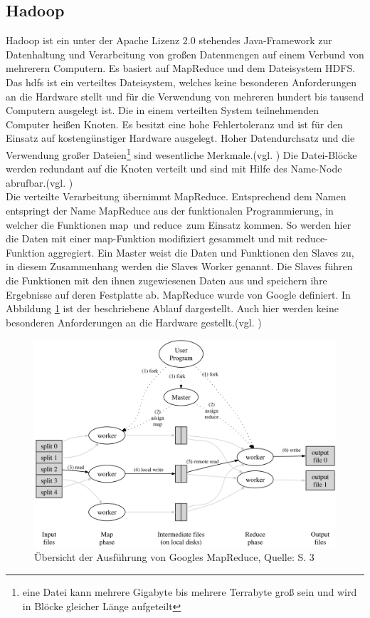 \subsection{Hadoop}
\label{hadoop}

Hadoop ist ein unter der Apache Lizenz 2.0 stehendes Java-Framework zur Datenhaltung und Verarbeitung von großen Datenmengen auf einem Verbund von mehrerern Computern.
Es basiert auf MapReduce und dem Dateisystem HDFS.\\
Das \Gls{hdfs} ist ein verteiltes Dateisystem, welches keine besonderen Anforderungen an die Hardware stellt und für die Verwendung von mehreren hundert bis tausend Computern ausgelegt ist.
Die in einem verteilten System teilnehmenden Computer heißen Knoten.
Es besitzt eine hohe Fehlertoleranz und ist für den Einsatz auf kostengünstiger Hardware ausgelegt.
Hoher Datendurchsatz und die Verwendung großer Dateien\footnote{eine Datei kann mehrere Gigabyte bis mehrere Terrabyte groß sein und wird in Blöcke gleicher Länge aufgeteilt} sind wesentliche Merkmale.(vgl. \cite[S.3]{paper:hadoop})
Die Datei-Blöcke werden redundant auf die Knoten verteilt und sind mit Hilfe des Name-Node abrufbar.(vgl. \cite[S.7]{ba:dan})\\
Die verteilte Verarbeitung übernimmt MapReduce.
Entsprechend dem Namen entspringt der Name MapReduce aus der funktionalen Programmierung, in welcher die Funktionen \glqq map\grqq \ und \glqq reduce\grqq \ zum Einsatz kommen.
So werden hier die Daten mit einer map-Funktion modifiziert gesammelt und mit reduce-Funktion aggregiert.
Ein Master weist die Daten und Funktionen den Slaves zu, in diesem Zusammenhang werden die Slaves Worker genannt.
Die Slaves führen die Funktionen mit den ihnen zugewiesenen Daten aus und speichern ihre Ergebnisse auf deren Festplatte ab.
MapReduce wurde von Google definiert.
In Abbildung \ref{fig:mapreduce} ist der beschriebene Ablauf dargestellt.
Auch hier werden keine besonderen Anforderungen an die Hardware gestellt.(vgl. \cite[S.3]{paper:mapreduce})
%
\begin{figure}[h]
\centering
\includegraphics[width=\textwidth]{Abbildungen/mapreduce.png}
\caption[Übersicht der Ausführung von Googles MapReduce]{Übersicht der Ausführung von Googles MapReduce, Quelle: \cite{paper:mapreduce} S. 3}
\label{fig:mapreduce}
\end{figure}
